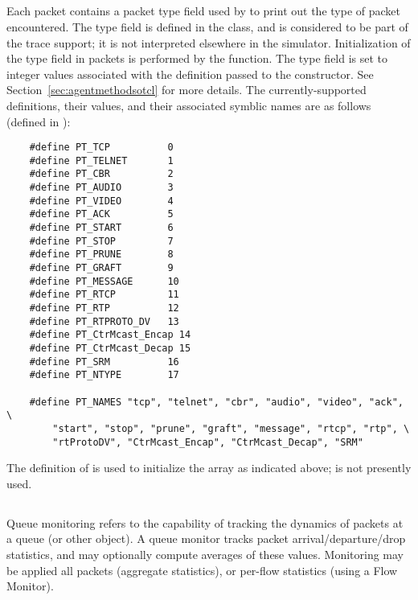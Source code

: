 \subsection{}

Each packet contains a packet type field used by 
to print out the type of packet encountered.
The type field is defined in the  class, and is considered
to be part of the trace support; it is not interpreted
elsewhere in the simulator.
Initialization of the type field in packets is performed by the
 function.
The type field is set to integer values associated with the
definition passed to the  constructor.
See Section~\ref{sec:agentmethodsotcl} for more details.
The currently-supported definitions, their values, and their
associated symblic names are as follows
(defined in ):
\begin{small}
\begin{verbatim}
	#define PT_TCP          0
	#define PT_TELNET       1
	#define PT_CBR          2
	#define PT_AUDIO        3
	#define PT_VIDEO        4
	#define PT_ACK          5
	#define PT_START        6
	#define PT_STOP         7
	#define PT_PRUNE        8
	#define PT_GRAFT        9
	#define PT_MESSAGE      10
	#define PT_RTCP         11
	#define PT_RTP          12
	#define PT_RTPROTO_DV   13
	#define PT_CtrMcast_Encap 14
	#define PT_CtrMcast_Decap 15
	#define PT_SRM          16
	#define PT_NTYPE        17

	#define PT_NAMES "tcp", "telnet", "cbr", "audio", "video", "ack", \
		"start", "stop", "prune", "graft", "message", "rtcp", "rtp", \
		"rtProtoDV", "CtrMcast_Encap", "CtrMcast_Decap", "SRM"

\end{verbatim}
\end{small}
The definition of  is used to initialize the
 array as indicated above;
\code{PT\_NTYPE} is not presently used.

\subsection{}

Queue monitoring refers to the capability of tracking the
dynamics of packets at a queue (or other object).
A queue monitor tracks packet arrival/departure/drop statistics,
and may optionally compute averages of these values.
Monitoring may be applied all packets (aggregate statistics), or
per-flow statistics (using a Flow Monitor).

